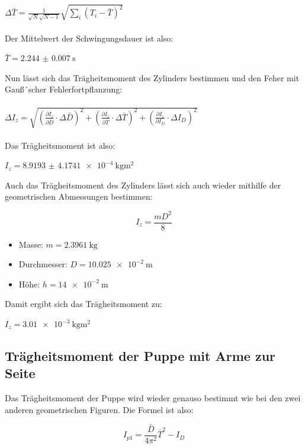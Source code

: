 $\Delta \bar{T} = \frac{1}{\sqrt{N}\sqrt{N-1}} \sqrt{\sum_{i}(T_i-\bar{T})^2}$\\\\

Der Mittelwert der Schwingungsdauer ist also:

\centerline{$\bar{T} = \SI{2.244(7)}{\second}$}

Nun lässt sich das Trägheitsmoment des Zylinders bestimmen und den Feher mit Gauß´scher
Fehlerfortpflanzung:\\\\

$\Delta I_z = \sqrt{\left(\frac{\partial I_z}{\partial \bar{D}} \cdot \Delta \bar{D} \right)^2
 + \left(\frac{\partial I_z}{\partial \bar{T}} \cdot \Delta \bar{T} \right)^2
  + \left(\frac{\partial I_z}{\partial I_D} \cdot \Delta I_D \right)^2}$\\\\

Das Trägheitsmoment ist also:

\centerline{$I_z = \SI{8.9193(41741)e-4}{\kilo\gram\meter\squared}$}


Auch das Trägheitsmoment des Zylinders lässt sich auch wieder mithilfe der geometrischen
Abmessungen bestimmen:

\begin{equation}
  I_z = \frac{mD^2}{8}
\end{equation}

\begin{itemize}
  \item Masse: $m = \SI{2.3961}{\kilo\gram}$
  \item Durchmesser: $D = \SI{10.025e-2}{\meter}$
  \item Höhe: $h = \SI{14e-2}{\meter}$
\end{itemize}

Damit ergibt sich das Trägheitsmoment zu:

\centerline{$I_z = \SI{3.01e-3}{\kilo\gram\meter\squared}$}

\subsection{Trägheitsmoment der Puppe mit Arme zur Seite}

Das Trägheitsmoment der Puppe wird wieder genauso bestimmt wie bei den zwei anderen
geometrischen Figuren. Die Formel ist also:

\begin{equation}
  I_{p1} = \frac{\bar{D}}{4\pi^2}\bar{T}^2 - I_D
\end{equation}


